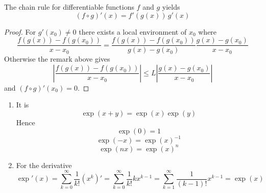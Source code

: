 \begin{lemma}
    The chain rule for differentiable functions \( f \) and \( g \) yields
    \[
        (f \circ g)'(x) = f'(g(x))\, g'(x)
    \]

    \begin{proof}
        For \( g'(x_0) \ne 0 \) there exists a local environment of \( x_0 \) where
        \[
            \frac{f(g(x)) - f(g(x_0))}{x - x_0} =
            \frac{f(g(x)) - f(g(x_0))}{g(x) - g(x_0)} \frac{g(x) - g(x_0)}{x - x_0}
        \]
        Otherwise the remark above gives
        \[
            \left| \frac{f(g(x)) - f(g(x_0))}{x - x_0} \right| \le
            L\left| \frac{g(x) - g(x_0)}{x - x_0}  \right|
        \]
        and \( (f \circ g)'(x_0) = 0 \).
    \end{proof}
\end{lemma}
\bigskip


\begin{lemma}\hfill
    \begin{enumerate}
        \item It is
              \[
                  \exp(x + y) = \exp(x)\exp(y)
              \]
              Hence
              \[
                  \exp(0) = 1
              \]
              \[
                  \exp(-x) = {\exp(x)}^{-1}
              \]
              \[
                  \exp(nx) = {\exp(x)}^n
              \]
        \item For the derivative
              \[
                  \exp'(x) = \sum_{k=0}^\infty \frac{1}{k!} (x^k)' = \sum_{k=0}^\infty \frac{1}{k!} kx^{k-1}
                  = \sum_{k=1}^\infty \frac{1}{(k-1)!} x^{k-1} = \exp(x)
              \]
    \end{enumerate}
\end{lemma}
\bigskip


